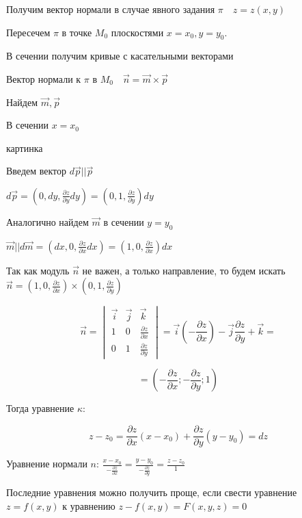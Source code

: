 \documentclass[12pt]{article}
\begin{document}
    \Nota Получим вектор нормали в случае явного задания $\pi \quad z = z(x, y)$

    Пересечем $\pi$ в точке $M_0$ плоскостями $x = x_0, y = y_0$.

    В сечении получим кривые с касательными векторами

    Вектор нормали к $\pi$ в $M_0 \quad \overrightarrow{n} = \overrightarrow{m} \times \overrightarrow{p}$

    Найдем $\overrightarrow{m}, \overrightarrow{p}$

    В сечении $x = x_0$

    картинка

    Введем вектор $d\overrightarrow{p} || \overrightarrow{p}$

    $d\overrightarrow{p} = (0, dy, \frac{\partial z}{\partial y}dy) = (0, 1, \frac{\partial z}{\partial y}) dy$

    Аналогично найдем $\overrightarrow{m}$ в сечении $y = y_0$

    $\overrightarrow{m} || d\overrightarrow{m} = (dx, 0, \frac{\partial z}{\partial x}dx) = (1, 0, \frac{\partial z}{\partial x}) dx$

    Так как модуль $\overrightarrow{n}$ не важен, а только направление, то будем искать
    $\overrightarrow{n} = (1, 0, \frac{\partial z}{\partial x}) \times (0, 1, \frac{\partial z}{\partial y})$

    \[\overrightarrow{n} =
    \begin{vmatrix} \overrightarrow{i} & \overrightarrow{j} & \overrightarrow{k} \\
        1 & 0 & \frac{\partial z}{\partial x} \\ 0 & 1 & \frac{\partial z}{\partial y}
    \end{vmatrix} = \overrightarrow{i} (-\frac{\partial z}{\partial x}) - \overrightarrow{j} \frac{\partial z}{\partial y} + \overrightarrow{k} = \]

    \[= (-\frac{\partial z}{\partial x}; -\frac{\partial z}{\partial y}; 1)\]

    Тогда уравнение $\kappa$:

    \[z - z_0 = \frac{\partial z}{\partial x}(x - x_0) + \frac{\partial z}{\partial y} (y - y_0) = dz\]

    Уравнение нормали $n$: $\frac{x - x_0}{-\frac{\partial z}{\partial x}} = \frac{y - y_0}{-\frac{\partial z}{\partial y}} = \frac{z - z_0}{1}$

    \Nota Последние уравнения можно получить проще, если свести уравнение $z = f(x, y)$ к уравнению $z - f(x, y) = F(x, y, z) = 0$
\end{document}
